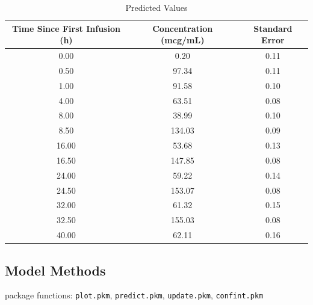 \documentclass{article}\usepackage[]{graphicx}\usepackage[]{color}
\begin{document}
\begin{table}[ht]
\centering
\caption{Predicted Values} 
\begin{tabular}{ccc}
  \hline
Time Since First Infusion (h) & Concentration (mcg/mL) & Standard Error \\ 
  \hline
0.00 & 0.20 & 0.11 \\ 
  0.50 & 97.34 & 0.11 \\ 
  1.00 & 91.58 & 0.10 \\ 
  4.00 & 63.51 & 0.08 \\ 
  8.00 & 38.99 & 0.10 \\ 
  8.50 & 134.03 & 0.09 \\ 
  16.00 & 53.68 & 0.13 \\ 
  16.50 & 147.85 & 0.08 \\ 
  24.00 & 59.22 & 0.14 \\ 
  24.50 & 153.07 & 0.08 \\ 
  32.00 & 61.32 & 0.15 \\ 
  32.50 & 155.03 & 0.08 \\ 
  40.00 & 62.11 & 0.16 \\ 
   \hline
\end{tabular}
\end{table}


\subsection{Model Methods}
package functions: \texttt{plot.pkm}, \texttt{predict.pkm}, \texttt{update.pkm}, \texttt{confint.pkm}
\end{document}
